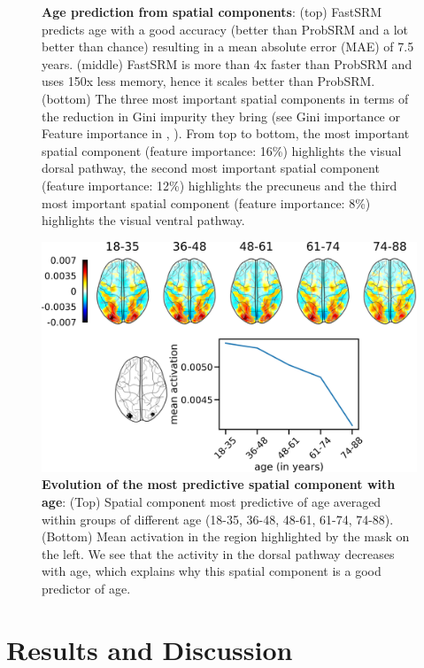 \begin{figure}
\caption{\textbf{Age prediction from spatial components}: (top) FastSRM predicts age with a good accuracy (better than ProbSRM and a lot better than chance) resulting in a mean absolute error (MAE) of 7.5 years. (middle) FastSRM is more than 4x faster than ProbSRM and uses 150x less memory, hence it scales better than ProbSRM. (bottom) The three most important spatial components in terms of the reduction in Gini impurity they bring (see Gini importance or Feature importance in \cite{breiman2001random}, \cite{louppe2013understanding}). From top to bottom, the most important spatial component (feature importance: 16\%) highlights the visual dorsal pathway, the second most important spatial component (feature importance: 12\%) highlights the precuneus and the third most important spatial component (feature importance: 8\%) highlights the visual ventral pathway.} 
\label{fig:predict_age}
\end{figure}

\begin{figure}
\centering
\includegraphics[scale=0.35]{figures/srm/feature_importance_age_prediction.png}
\caption{\textbf{Evolution of the most predictive spatial component with age}: (Top) Spatial component most predictive of age averaged within groups of different age (18-35, 36-48, 48-61, 61-74, 74-88). (Bottom) Mean activation in the region highlighted by the mask on the left. We see that the activity in the dorsal pathway decreases with age, which explains why this spatial component is a good predictor of age.}
\label{fig:predict_age_interpretation}
\end{figure}



\section{Results and Discussion}


